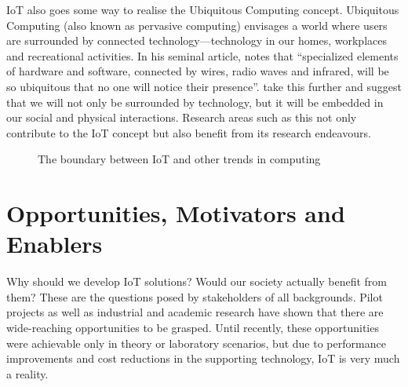   IoT also goes some way to realise the Ubiquitous Computing concept. Ubiquitous Computing (also known as pervasive computing) envisages a world where users are surrounded by connected technology---technology in our homes, workplaces and recreational activities. In his seminal article, \cite{Weiser:1999} notes that ``specialized elements of hardware and software, connected by wires, radio waves and infrared, will be so ubiquitous that no one will notice their presence''. \citet{Lyytinen:2002} take this further and suggest that we will not only be surrounded by technology, but it will be embedded in our social and physical interactions. Research areas such as this not only contribute to the IoT concept but also benefit from its research endeavours.

  \begin{figure}
    \centering
    \caption{The boundary between IoT and other trends in computing}\label{iotRelationship}
  \end{figure}

  \section{Opportunities, Motivators and Enablers}
    Why should we develop IoT solutions? Would our society actually benefit from them? These are the questions posed by stakeholders of all backgrounds. Pilot projects as well as industrial and academic research have shown that there are wide-reaching opportunities to be grasped. Until recently, these opportunities were achievable only in theory or laboratory scenarios, but due to performance improvements and cost reductions in the supporting technology, IoT is very much a reality.

